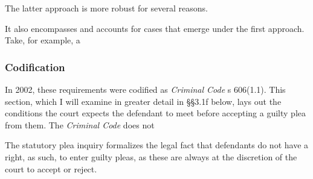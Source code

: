 The latter approach is more robust for several reasons. 

It also encompasses and accounts for cases that emerge under the first approach. Take, for example, a

\subsubsection{Codification}

In 2002, these requirements were codified as \textit{Criminal Code} s 606(1.1). This section, which I will examine in greater detail in §§3.1f below, lays out the conditions the court expects the defendant to meet before accepting a guilty plea from them. The \textit{Criminal Code} does not 

The statutory plea inquiry formalizes the legal fact that defendants do not have a right, as such, to enter guilty pleas, as these are always at the discretion of the court to accept or reject.
